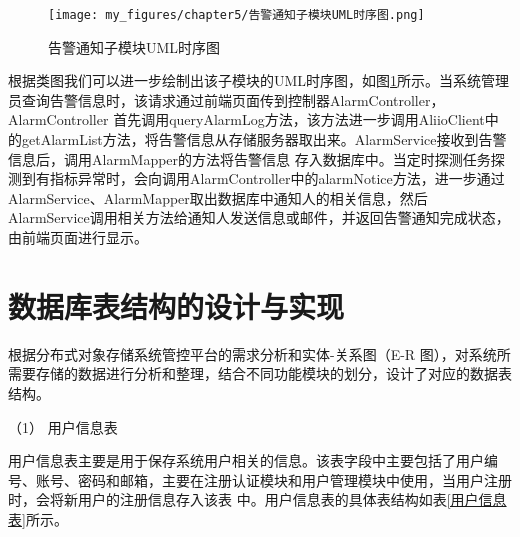 \begin{figure}[htb]
    \centering
    \texttt{[image: my\_figures/chapter5/告警通知子模块UML时序图.png]}
    \caption{告警通知子模块UML时序图}
    \label{fig:告警通知子模块UML时序图}
\end{figure}

根据类图我们可以进一步绘制出该子模块的UML时序图，如图\ref{fig:告警通知子模块UML时序图}所示。当系统管理员查询告警信息时，该请求通过前端页面传到控制器AlarmController，AlarmController
首先调用queryAlarmLog方法，该方法进一步调用AliioClient中的getAlarmList方法，将告警信息从存储服务器取出来。AlarmService接收到告警信息后，调用AlarmMapper的方法将告警信息
存入数据库中。当定时探测任务探测到有指标异常时，会向调用AlarmController中的alarmNotice方法，进一步通过AlarmService、AlarmMapper取出数据库中通知人的相关信息，然后
AlarmService调用相关方法给通知人发送信息或邮件，并返回告警通知完成状态，由前端页面进行显示。


\section{数据库表结构的设计与实现}


根据分布式对象存储系统管控平台的需求分析和实体-关系图（E-R 图），对系统所需要存储的数据进行分析和整理，结合不同功能模块的划分，设计了对应的数据表结构。



（1） 用户信息表

用户信息表主要是用于保存系统用户相关的信息。该表字段中主要包括了用户编号、账号、密码和邮箱，主要在注册认证模块和用户管理模块中使用，当用户注册时，会将新用户的注册信息存入该表
中。用户信息表的具体表结构如表\ref{用户信息表}所示。

